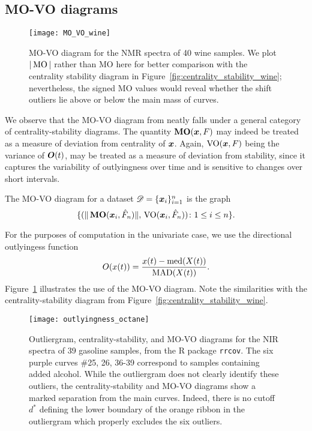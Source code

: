 \subsection{MO-VO diagrams}

\begin{figure}
    \centering
    \texttt{[image: MO\_VO\_wine]}
    \caption{
        MO-VO diagram for the NMR spectra of 40 wine samples.
        We plot $|\operatorname{MO}|$ rather than MO here for better comparison with the
        centrality stability diagram in
        Figure~\ref{fig:centrality_stability_wine}; nevertheless, the signed
        MO values would reveal whether the shift outliers lie above or below
        the main mass of curves.
    }
    \label{fig:MO_VO_wine}
\end{figure}

We observe that the MO-VO diagram from \textcite{dai-genton-2018} neatly falls
under a general category of centrality-stability diagrams.
The quantity $\operatorname{\textbf{MO}}(\bm{x}, F)$ may indeed be treated as a measure of deviation
from centrality of $\bm{x}$.
Again, $\operatorname{VO}(\bm{x}, F)$ being the variance of $\bm{O}(t)$, may be treated as a
measure of deviation from stability, since it captures the variability of
outlyingness over time and is sensitive to changes over short intervals.

\begin{definition}[MO-VO diagram]
    The MO-VO diagram for a dataset $\mathscr{D} = \{\bm{x}_i\}_{i = 1}^n$ is the
    graph
    \begin{equation}
        \{(\Vert \operatorname{\textbf{MO}}(\bm{x}_i, \hat{F}_n) \Vert,\, \operatorname{VO}(\bm{x}_i, \hat{F}_n))\colon 1 \leq i \leq n\}.
    \end{equation}
\end{definition}


For the purposes of computation in the univariate case, we use the directional
outlyingess function
\begin{equation}
    O(x(t)) = \frac{x(t) - \operatorname{med}(X(t))}{\operatorname{MAD}(X(t))}.
\end{equation}
Figure~\ref{fig:MO_VO_wine} illustrates the use of the MO-VO diagram.
Note the similarities with the centrality-stability diagram from
Figure~\ref{fig:centrality_stability_wine}.




\begin{figure}
    \centering
    \texttt{[image: outlyingness\_octane]}
    \caption{
        Outliergram, centrality-stability, and MO-VO diagrams for the NIR
        spectra of 39 gasoline samples, from the R package \texttt{rrcov}.
        The six purple curves \#25, 26, 36-39 correspond to samples containing
        added alcohol.
        While the outliergram does not clearly identify these outliers, the
        centrality-stability and MO-VO diagrams show a marked separation from
        the main curves.
        Indeed, there is no cutoff $d^*$ defining the lower boundary of the
        orange ribbon in the outliergram which properly excludes the six
        outliers.
    }
    \label{fig:outlyingness_octane}
\end{figure}

